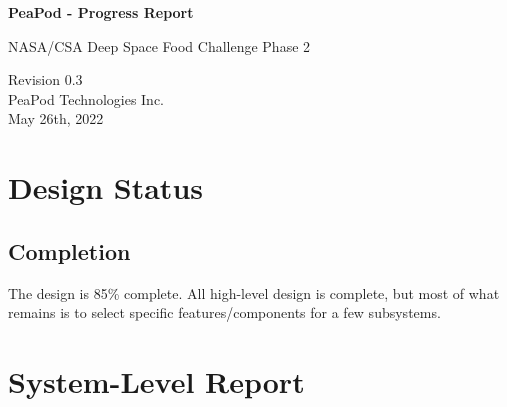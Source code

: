 \documentclass{../tex/report}
\begin{document}
\begin{titlepage}
    \begin{center}
        \vspace*{1.2cm}

        \textbf{\large{PeaPod - Progress Report}}

        \vspace{0.5cm}

        NASA/CSA Deep Space Food Challenge Phase 2

        \vfill
        
        \vspace{.75cm}

        Revision 0.3\\
        PeaPod Technologies Inc.\\
        May 26th, 2022

    \end{center}
\end{titlepage}

\thispagestyle{plain}

\tableofcontents
\clearpage

\section{Design Status}

\subsection{Completion}

The design is 85\% complete. All high-level design is complete, but most of what remains is to select specific features/components for a few subsystems.



\clearpage

\section{System-Level Report}



\clearpage



\clearpage


\end{document}
